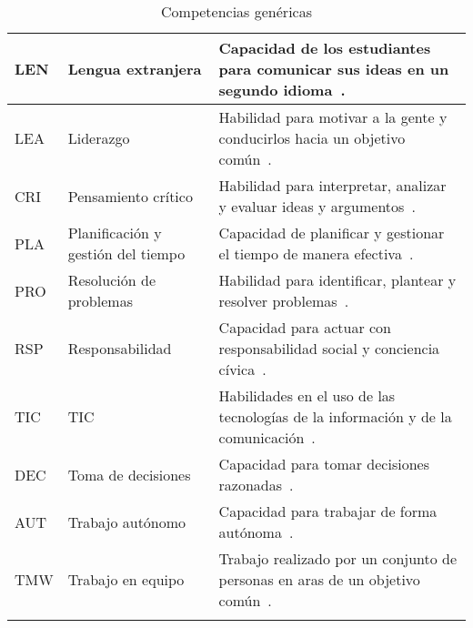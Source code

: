 \begin{landscape}
\begin{center}
\begin{longtable}{| L{1cm} | L{6cm} | L{15.2cm} |}
    LEN & Lengua extranjera & Capacidad de los estudiantes para comunicar sus ideas en un segundo idioma~\cite{gass2013second}. \\
    \hline
    LEA & Liderazgo & Habilidad para motivar a la gente y conducirlos hacia un objetivo común~\cite{gonzalez2005tuning}. \\
    \hline
    CRI & Pensamiento crítico & Habilidad para interpretar, analizar y evaluar ideas y argumentos~\cite{fisher2011critical}. \\
    \hline
    PLA & Planificación y gestión del tiempo & Capacidad de planificar y gestionar el tiempo de manera efectiva~\cite{gonzalez2005tuning}. \\
    \hline
    PRO & Resolución de problemas & Habilidad para identificar, plantear y resolver problemas~\cite{gonzalez2005tuning}. \\
    \hline
    RSP & Responsabilidad & Capacidad para actuar con responsabilidad social y conciencia cívica~\cite{gonzalez2005tuning}. \\
    \hline
    TIC & TIC & Habilidades en el uso de las tecnologías de la información y de la comunicación~\cite{gonzalez2005tuning}. \\
    \hline
    DEC & Toma de decisiones & Capacidad para tomar decisiones razonadas~\cite{gonzalez2005tuning}. \\
    \hline
    AUT & Trabajo autónomo & Capacidad para trabajar de forma autónoma~\cite{gonzalez2005tuning}. \\
    \hline
    TMW & Trabajo en equipo & Trabajo realizado por un conjunto de personas en aras de un objetivo común~\cite{dixon1992teamwork}. \\
    \hline
\caption{Competencias genéricas}
\label{tab:CodigosCompetenciasGenericas}
\end{longtable} 
\end{center}
\end{landscape}
\pagestyle{fancy}
